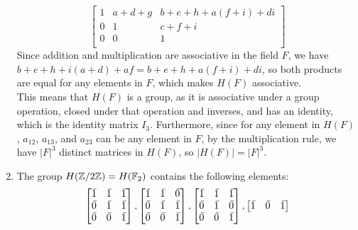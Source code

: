 \documentclass[12pt]{article}
\begin{document}
\begin{enumerate}[label=\textbf{\alph*.}]
\[\begin{bmatrix}
                1 & a + d + g & b + e + h + a(f + i) + di \\
                0 & 1 & c + f + i \\
                0 & 0 & 1 \\
            \end{bmatrix} \]
            Since addition and multiplication are associative in the field
            $F$, 
            we have $ b + e + h + i(a + d) + af = b + e + h + a(f + i) + di$,
            so both products are equal for any elements in $F$,
            which makes $H(F)$ associative. \\
            This means that $H(F)$ is a group, as it is associative
            under a group operation,
            closed under that operation and inverses,
            and has an identity,
            which is the identity matrix $I_3$.
            Furthermore, since for any element in $H(F)$,
            $a_{12}$, $a_{13}$, and $a_{23}$ can be any element in $F$,
            by the multiplication rule,
            we have $|F|^3$ distinct matrices in $H(F)$,
            so $|H(F)| = |F|^3$.
        \item
            The group $H(\mathbb{Z}/2\mathbb{Z}) = H(\mathbb{F}_2)$ contains the following elements:
            \[ \begin{bmatrix}
                \olsi{1} & \olsi{1} & \olsi{1} \\
                \olsi{0} & \olsi{1} & \olsi{1} \\
                \olsi{0} & \olsi{0} & \olsi{1} \\
            \end{bmatrix},
            \begin{bmatrix}
                \olsi{1} & \olsi{1} & \olsi{0} \\
                \olsi{0} & \olsi{1} & \olsi{1} \\
                \olsi{0} & \olsi{0} & \olsi{1} \\
            \end{bmatrix},
            \begin{bmatrix}
                \olsi{1} & \olsi{1} & \olsi{1} \\
                \olsi{0} & \olsi{1} & \olsi{0} \\
                \olsi{0} & \olsi{0} & \olsi{1} \\
            \end{bmatrix},
            \begin{bmatrix}
                \olsi{1} & \olsi{0} & \olsi{1} \\

\end{bmatrix}\]
\end{enumerate}
\end{document}
